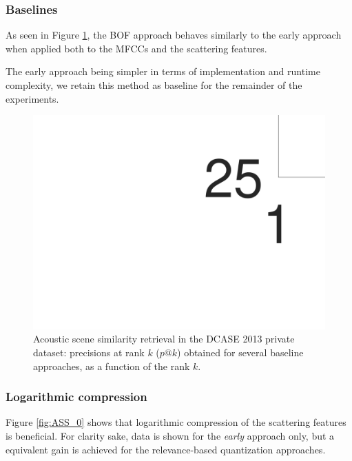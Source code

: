 \documentclass[smallextended]{svjour3}
\newcommand{\ja}[1]{\textcolor{magenta}{Joakim : #1}}
\begin{document}
\subsubsection*{Baselines}

As seen in Figure \ref{fig:ASS_-1}, the BOF approach behaves similarly to the early approach when applied both to the MFCCs and the scattering features.

The early approach being simpler in terms of implementation and runtime complexity, we retain this method as baseline for the remainder of the experiments.

\begin{figure}[t]
\begin{center}
\includegraphics[width=\columnwidth]{figures/baselines}
\caption{Acoustic scene similarity retrieval in the DCASE 2013 private dataset: precisions at rank $k$ ($p@k$) obtained for several baseline approaches, as a function of the rank $k$.}
\label{fig:ASS_-1}
\end{center}
\end{figure}

\subsubsection*{Logarithmic compression}

Figure \ref{fig:ASS_0} shows that logarithmic compression of the scattering features is beneficial. For clarity sake, data is shown  for the \emph{early} approach only, but a equivalent gain is achieved for the relevance-based quantization approaches. %
\end{document}
